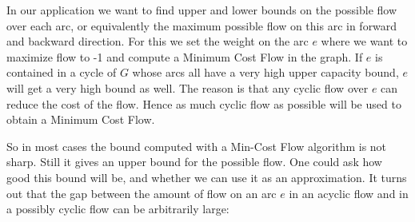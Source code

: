 In our application we want to find upper and lower bounds on the possible flow over each arc, or equivalently the 
maximum possible flow on this arc in forward and backward direction. For this we set the 
weight on the arc $e$ where we want to maximize flow to -1 and compute a Minimum Cost Flow in the graph. If $e$ is 
contained in a cycle of $G$ whose arcs all have a very high upper capacity bound, $e$ will get a very high bound as 
well. The reason is that any cyclic flow over $e$ can reduce the cost of the flow. Hence as much cyclic flow as 
possible will be used to obtain a Minimum Cost Flow. 

So in most cases the bound computed with a Min-Cost Flow algorithm is not sharp. Still it gives an upper bound for the 
possible flow. One could ask how good this bound will be, and whether we can use it as an approximation. It turns 
out that the gap between the amount of flow on an arc $e$ in an acyclic flow and in a possibly cyclic flow can be 
arbitrarily large:

